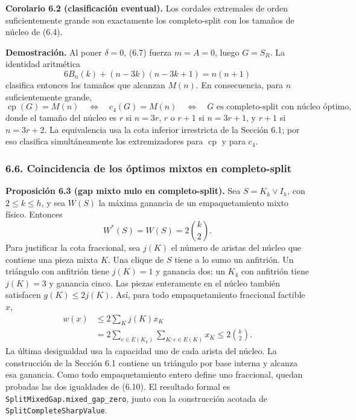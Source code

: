 \documentclass[spanish,11pt,a4paper]{article}
\begin{document}

\textbf{Corolario 6.2 (clasificación eventual).} Los cordales extremales de orden suficientemente grande son exactamente los completo-split con los tamaños de núcleo de (6.4).

\textbf{Demostración.} Al poner \(\delta=0\), (6.7) fuerza \(m=A=0\), luego \(G=S_R\). La identidad aritmética \[
6B_n(k)+(n-3k)(n-3k+1)=n(n+1)
\tag{6.8}
\] clasifica entonces los tamaños que alcanzan \(M(n)\). En consecuencia, para \(n\) suficientemente grande, \[
\operatorname{cp}(G)=M(n)
\quad\Longleftrightarrow\quad
c_4(G)=M(n)
\quad\Longleftrightarrow\quad
G\text{ es completo-split con núcleo óptimo},
\tag{6.9}
\] donde el tamaño del núcleo es \(r\) si \(n=3r\), \(r\) o \(r+1\) si \(n=3r+1\), y \(r+1\) si \(n=3r+2\). La equivalencia usa la cota inferior irrestricta de la Sección 6.1; por eso clasifica simultáneamente los extremizadores para \(\operatorname{cp}\) y para \(c_4\).


\subsubsection{6.6. Coincidencia de los óptimos mixtos en completo-split}\label{coincidencia-de-los-uxf3ptimos-mixtos-en-completo-split}


\textbf{Proposición 6.3 (gap mixto nulo en completo-split).} Sea \(S=K_k\vee I_h\), con \(2\le k\le h\), y sea \(W(S)\) la máxima ganancia de un empaquetamiento mixto físico. Entonces \[
W^*(S)=W(S)=2\binom k2.
\tag{6.10}
\] Para justificar la cota fraccional, sea \(j(K)\) el número de aristas del núcleo que contiene una pieza mixta \(K\). Una clique de \(S\) tiene a lo sumo un anfitrión. Un triángulo con anfitrión tiene \(j(K)=1\) y ganancia dos; un \(K_4\) con anfitrión tiene \(j(K)=3\) y ganancia cinco. Las piezas enteramente en el núcleo también satisfacen \(g(K)\le2j(K)\). Así, para todo empaquetamiento fraccional factible \(x\), \[
\begin{aligned}
w(x)&\le2\sum_K j(K)x_K\\
&=2\sum_{e\in E(K_k)}\sum_{K:e\in E(K)}x_K
\le2\binom k2.
\end{aligned}
\tag{6.11}
\] La última desigualdad usa la capacidad uno de cada arista del núcleo. La construcción de la Sección 6.1 contiene un triángulo por base interna y alcanza esa ganancia. Como todo empaquetamiento entero define uno fraccional, quedan probadas las dos igualdades de (6.10). El resultado formal es \nolinkurl{SplitMixedGap.mixed_gap_zero}, junto con la construcción acotada de \nolinkurl{SplitCompleteSharpValue}.
\end{document}

